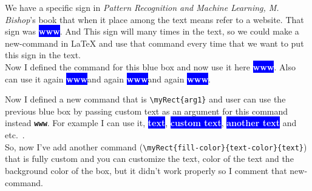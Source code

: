 \documentclass[12pt]{article}
\newcommand{\www}{\colorbox{blue}{\textcolor{white}{\textsf{\textbf{www}}}}}
\newcommand{\myRect}[1]{\colorbox{blue}{\textcolor{white}{\textsf{\textbf{#1}}}}}
\begin{document}
	
	We have a specific sign in \emph{Pattern Recognition and Machine Learning, M. Bishop}'s book that when it place among the text means refer to a website. That sign was
	\www. And This sign will many times in the text, so we could make a new-command in \LaTeX {} and use that command every time that we want to put this sign in the text.\\
	
	Now I defined the command for this blue box and now use it here \www. Also can use it again \www and again \www and again \www.
	
	Now I defined a new command that is \verb*|\myRect{arg1}| and user can use the previous blue box by passing custom text as an argument for this command instead \textbf{\texttt{www}}. For example I can use it, \myRect{text}, \myRect{custom text}, \myRect{another text} and etc.\ .\\
	
	So, now I've add another command (\verb*|\myRect{fill-color}{text-color}{text}|) that is fully custom and you can customize the text, color of the text and the background color of the box, but it didn't work properly so I comment that new-command.\\
	
\end{document}
